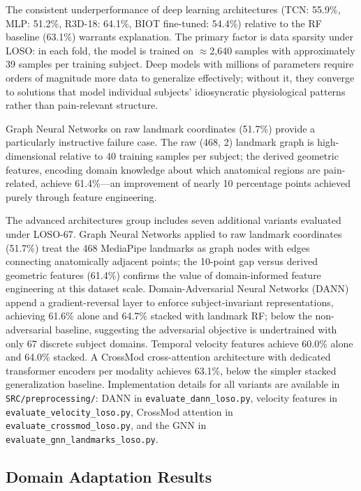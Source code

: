 \documentclass[10pt, twocolumn]{article}
\begin{document}
The consistent underperformance of deep learning architectures (TCN: 55.9\%, MLP: 51.2\%,
R3D-18: 64.1\%, BIOT fine-tuned: 54.4\%) relative to the RF baseline (63.1\%) warrants
explanation. The primary factor is data sparsity under LOSO: in each fold, the model is
trained on $\approx$2,640 samples with approximately 39 samples per training subject. Deep
models with millions of parameters require orders of magnitude more data to generalize
effectively; without it, they converge to solutions that model individual subjects'
idiosyncratic physiological patterns rather than pain-relevant structure.

Graph Neural Networks on raw landmark coordinates (51.7\%) provide a particularly
instructive failure case. The raw (468, 2) landmark graph is high-dimensional relative to
40 training samples per subject; the derived geometric features, encoding domain knowledge
about which anatomical regions are pain-related, achieve 61.4\%---an improvement of nearly
10 percentage points achieved purely through feature engineering.

The advanced architectures group includes seven additional variants evaluated under
LOSO-67. Graph Neural Networks applied to raw landmark coordinates (51.7\%) treat the 468
MediaPipe landmarks as graph nodes with edges connecting anatomically adjacent points; the
10-point gap versus derived geometric features (61.4\%) confirms the value of
domain-informed feature engineering at this dataset scale. Domain-Adversarial Neural
Networks (DANN) append a gradient-reversal layer to enforce subject-invariant
representations, achieving 61.6\% alone and 64.7\% stacked with landmark RF; below the
non-adversarial baseline, suggesting the adversarial objective is undertrained with only
67 discrete subject domains. Temporal velocity features achieve 60.0\% alone and 64.0\%
stacked. A CrossMod cross-attention architecture with dedicated transformer encoders per
modality achieves 63.1\%, below the simpler stacked generalization baseline.
Implementation details for all variants are available in \texttt{SRC/preprocessing/}:
DANN in \texttt{evaluate\_dann\_loso.py}, velocity features in
\texttt{evaluate\_velocity\_loso.py}, CrossMod attention in
\texttt{evaluate\_crossmod\_loso.py}, and the GNN in
\texttt{evaluate\_gnn\_landmarks\_loso.py}.

\subsection{Domain Adaptation Results}
\end{document}
